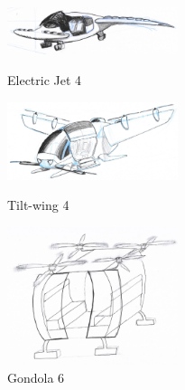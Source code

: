 \begin{figure}[H]
  \centering
  \begin{minipage}[b]{0.25\textwidth}
    \includegraphics[width=5.0cm]{./Figures/ejet.jpg}
    \captionsetup{justification=centering}
    \caption{Electric Jet 4}
    \label{4-6A}
  \end{minipage}
  \hspace{1.5cm}
  \begin{minipage}[b]{0.30\textwidth}
    \includegraphics[width=5.0cm]{./Figures/bumblebee.jpg}
    \captionsetup{justification=centering}
    \caption{Tilt-wing 4}
    \label{4-6B}
  \end{minipage}
  \hspace{0.5cm}
  \begin{minipage}[b]{0.25\textwidth}
    \includegraphics[width=5.0cm]{./Figures/carriage.jpg}
    \captionsetup{justification=centering}
    \caption{Gondola 6}
    \label{4-6C}
  \end{minipage}  
\end{figure}


